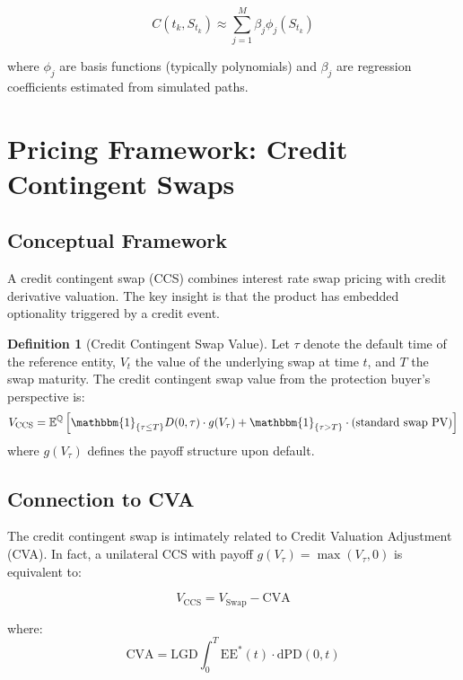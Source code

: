 \documentclass[11pt,a4paper]{article}
\theoremstyle{definition}
\newtheorem{definition}{Definition}[section]
\newcommand{\E}{\mathbb{E}}
\newcommand{\Q}{\mathbb{Q}}
\newcommand{\ind}{\mathbbm{1}}
\newcommand{\diff}{\mathrm{d}}
\newcommand{\LGD}{\mathrm{LGD}}
\newcommand{\PD}{\mathrm{PD}}
\newcommand{\EE}{\mathrm{EE}}
\newcommand{\CVA}{\mathrm{CVA}}
\begin{document}
\begin{equation}
C(t_k, S_{t_k}) \approx \sum_{j=1}^{M} \beta_j \phi_j(S_{t_k})
\end{equation}

where $\phi_j$ are basis functions (typically polynomials) and $\beta_j$ are regression coefficients estimated from simulated paths.

\section{Pricing Framework: Credit Contingent Swaps}

\subsection{Conceptual Framework}

A credit contingent swap (CCS) combines interest rate swap pricing with credit derivative valuation. The key insight is that the product has embedded optionality triggered by a credit event.

\begin{definition}[Credit Contingent Swap Value]
Let $\tau$ denote the default time of the reference entity, $V_t$ the value of the underlying swap at time $t$, and $T$ the swap maturity. The credit contingent swap value from the protection buyer's perspective is:
\begin{equation}
V_{\text{CCS}} = \E^{\Q}\left[ \ind_{\{\tau \leq T\}} D(0,\tau) \cdot g(V_\tau) + \ind_{\{\tau > T\}} \cdot \text{(standard swap PV)} \right]
\end{equation}
where $g(V_\tau)$ defines the payoff structure upon default.
\end{definition}

\subsection{Connection to CVA}

The credit contingent swap is intimately related to Credit Valuation Adjustment (CVA). In fact, a unilateral CCS with payoff $g(V_\tau) = \max(V_\tau, 0)$ is equivalent to:

\begin{equation}
V_{\text{CCS}} = V_{\text{Swap}} - \CVA
\end{equation}

where:
\begin{equation}
\CVA = \LGD \int_0^T \EE^*(t) \cdot \diff \PD(0,t)
\end{equation}
\end{document}
